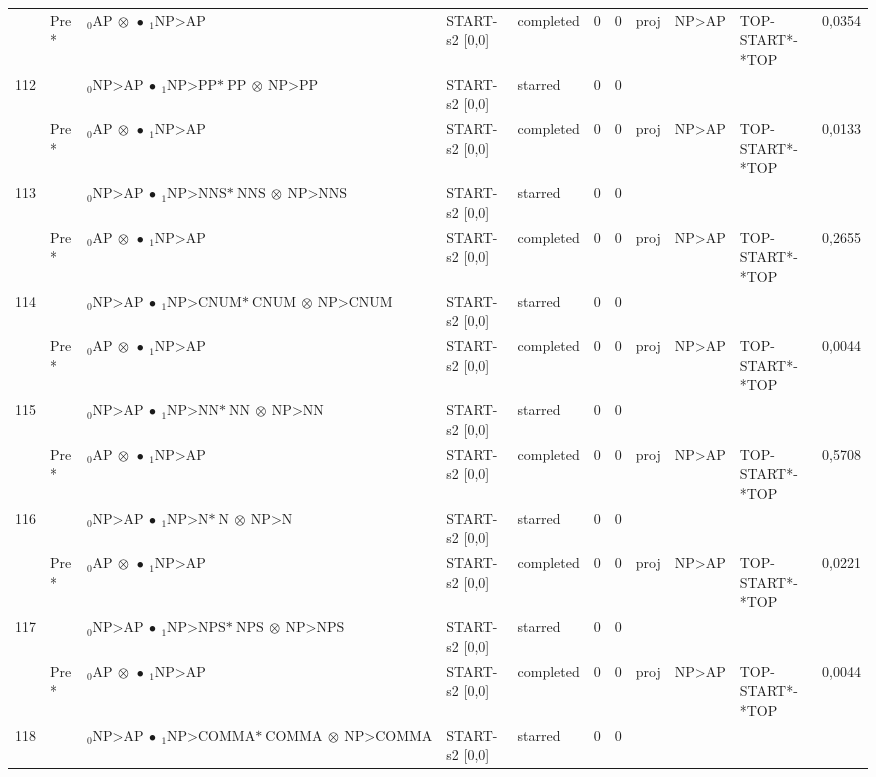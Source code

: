 \documentclass[10pt]{article}
\begin{document}
\begin{longtable}[htbp]{lllllllllll}
 & Pre *& $ {}_0 \textrm{AP} \  \otimes \  \bullet \ {}_{1} \textrm{NP>AP} $ & START-s2 [0,0] & completed & 0 & 0 & proj & NP>AP & TOP-START*-*TOP & 0,0354 \\ 
112 & & $ {}_0 \textrm{NP>AP} \  \bullet \ {}_{1} \textrm{NP>PP*} \ \textrm{PP} \  \otimes \ \textrm{NP>PP} $ & START-s2 [0,0] & starred & 0 & 0 & & & & \\ 
 & Pre *& $ {}_0 \textrm{AP} \  \otimes \  \bullet \ {}_{1} \textrm{NP>AP} $ & START-s2 [0,0] & completed & 0 & 0 & proj & NP>AP & TOP-START*-*TOP & 0,0133 \\ 
113 & & $ {}_0 \textrm{NP>AP} \  \bullet \ {}_{1} \textrm{NP>NNS*} \ \textrm{NNS} \  \otimes \ \textrm{NP>NNS} $ & START-s2 [0,0] & starred & 0 & 0 & & & & \\ 
 & Pre *& $ {}_0 \textrm{AP} \  \otimes \  \bullet \ {}_{1} \textrm{NP>AP} $ & START-s2 [0,0] & completed & 0 & 0 & proj & NP>AP & TOP-START*-*TOP & 0,2655 \\ 
114 & & $ {}_0 \textrm{NP>AP} \  \bullet \ {}_{1} \textrm{NP>CNUM*} \ \textrm{CNUM} \  \otimes \ \textrm{NP>CNUM} $ & START-s2 [0,0] & starred & 0 & 0 & & & & \\ 
 & Pre *& $ {}_0 \textrm{AP} \  \otimes \  \bullet \ {}_{1} \textrm{NP>AP} $ & START-s2 [0,0] & completed & 0 & 0 & proj & NP>AP & TOP-START*-*TOP & 0,0044 \\ 
115 & & $ {}_0 \textrm{NP>AP} \  \bullet \ {}_{1} \textrm{NP>NN*} \ \textrm{NN} \  \otimes \ \textrm{NP>NN} $ & START-s2 [0,0] & starred & 0 & 0 & & & & \\ 
 & Pre *& $ {}_0 \textrm{AP} \  \otimes \  \bullet \ {}_{1} \textrm{NP>AP} $ & START-s2 [0,0] & completed & 0 & 0 & proj & NP>AP & TOP-START*-*TOP & 0,5708 \\ 
116 & & $ {}_0 \textrm{NP>AP} \  \bullet \ {}_{1} \textrm{NP>N*} \ \textrm{N} \  \otimes \ \textrm{NP>N} $ & START-s2 [0,0] & starred & 0 & 0 & & & & \\ 
 & Pre *& $ {}_0 \textrm{AP} \  \otimes \  \bullet \ {}_{1} \textrm{NP>AP} $ & START-s2 [0,0] & completed & 0 & 0 & proj & NP>AP & TOP-START*-*TOP & 0,0221 \\ 
117 & & $ {}_0 \textrm{NP>AP} \  \bullet \ {}_{1} \textrm{NP>NPS*} \ \textrm{NPS} \  \otimes \ \textrm{NP>NPS} $ & START-s2 [0,0] & starred & 0 & 0 & & & & \\ 
 & Pre *& $ {}_0 \textrm{AP} \  \otimes \  \bullet \ {}_{1} \textrm{NP>AP} $ & START-s2 [0,0] & completed & 0 & 0 & proj & NP>AP & TOP-START*-*TOP & 0,0044 \\ 
118 & & $ {}_0 \textrm{NP>AP} \  \bullet \ {}_{1} \textrm{NP>COMMA*} \ \textrm{COMMA} \  \otimes \ \textrm{NP>COMMA} $ & START-s2 [0,0] & starred & 0 & 0 & & & & \\ 

\end{longtable}
\end{document}
